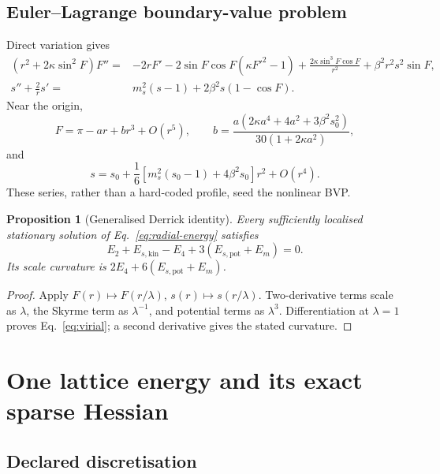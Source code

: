 \documentclass[11pt]{article}
\newtheorem{proposition}{Proposition}[section]
\theoremstyle{definition}
\theoremstyle{remark}
\begin{document}
\subsection{Euler--Lagrange boundary-value problem}

Direct variation gives
\begin{align}
 (r^2+2\kappa\sin^2F)F''={}&-2rF'
 -2\sin F\cos F(\kappa F'^2-1)
 +\frac{2\kappa\sin^3F\cos F}{r^2}
 +\beta^2r^2s^2\sin F,
 \label{eq:F-bvp}\\
 s''+\frac2r s'={}&m_s^2(s-1)+2\beta^2s(1-\cos F).
 \label{eq:s-bvp}
\end{align}
Near the origin,
\begin{equation}
 F=\pi-ar+br^3+O(r^5),\qquad
 b=\frac{a(2\kappa a^4+4a^2+3\beta^2s_0^2)}
 {30(1+2\kappa a^2)},
 \label{eq:origin-F}
\end{equation}
and
\begin{equation}
 s=s_0+\frac16[m_s^2(s_0-1)+4\beta^2s_0]r^2+O(r^4).
 \label{eq:origin-s}
\end{equation}
These series, rather than a hard-coded profile, seed the nonlinear BVP.

\begin{proposition}[Generalised Derrick identity]
Every sufficiently localised stationary solution of
Eq.~\eqref{eq:radial-energy} satisfies
\begin{equation}
 E_2+E_{s,\mathrm{kin}}-E_4
 +3(E_{s,\mathrm{pot}}+E_m)=0.
 \label{eq:virial}
\end{equation}
Its scale curvature is \(2E_4+6(E_{s,\mathrm{pot}}+E_m)\).
\end{proposition}
\begin{proof}
Apply \(F(r)\mapsto F(r/\lambda)\),
\(s(r)\mapsto s(r/\lambda)\).  Two-derivative terms scale as \(\lambda\),
the Skyrme term as \(\lambda^{-1}\), and potential terms as
\(\lambda^3\).  Differentiation at \(\lambda=1\) proves
Eq.~\eqref{eq:virial}; a second derivative gives the stated curvature.
\end{proof}

\section{One lattice energy and its exact sparse Hessian}

\subsection{Declared discretisation}
\end{document}

